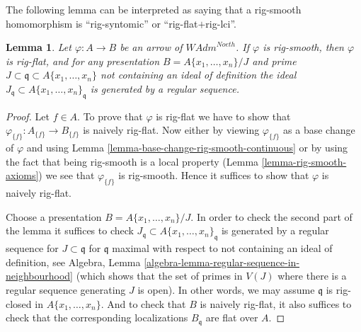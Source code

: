\documentclass{stacks-project}
\theoremstyle{plain}
\newtheorem{lemma}[subsection]{Lemma}
\theoremstyle{definition}
\theoremstyle{remark}
\numberwithin{equation}{subsection}
\begin{document}
\noindent
The following lemma can be interpreted as saying that a rig-smooth
homomorphism is ``rig-syntomic'' or ``rig-flat$+$rig-lci''.

\begin{lemma}
\label{lemma-rig-smooth-rig-flat}
Let $\varphi : A \to B$ be an arrow of $\textit{WAdm}^{Noeth}$.
If $\varphi$ is rig-smooth, then $\varphi$ is rig-flat, and
for any presentation $B = A\{x_1, \ldots, x_n\}/J$
and prime $J \subset \mathfrak q \subset A\{x_1, \ldots, x_n\}$
not containing an ideal of definition the ideal
$J_\mathfrak q \subset A\{x_1, \ldots, x_n\}_\mathfrak q$
is generated by a regular sequence.
\end{lemma}

\begin{proof}
Let $f \in A$. To prove that $\varphi$ is rig-flat we have to show
that $\varphi_{\{f\}} : A_{\{f\}} \to B_{\{f\}}$ is naively rig-flat.
Now either by viewing $\varphi_{\{f\}}$ as a base change of $\varphi$
and using Lemma \ref{lemma-base-change-rig-smooth-continuous}
or by using the fact that being rig-smooth
is a local property (Lemma \ref{lemma-rig-smooth-axioms}) we see that
$\varphi_{\{f\}}$ is rig-smooth. Hence it suffices to show
that $\varphi$ is naively rig-flat.

\medskip\noindent
Choose a presentation $B = A\{x_1, \ldots, x_n\}/J$.
In order to check the second part of the lemma it suffices
to check $J_\mathfrak q \subset A\{x_1, \ldots, x_n\}_\mathfrak q$
is generated by a regular sequence for $J \subset \mathfrak q$
for $\mathfrak q$ maximal with respect to not containing
an ideal of definition, see
Algebra, Lemma \ref{algebra-lemma-regular-sequence-in-neighbourhood}
(which shows that the set of primes in $V(J)$ where there is
a regular sequence generating $J$ is open).
In other words, we may assume $\mathfrak q$ is rig-closed
in $A\{x_1, \ldots, x_n\}$. And to check that
$B$ is naively rig-flat, it also suffices to
check that the corresponding localizations $B_\mathfrak q$
are flat over $A$.


\end{proof}
\end{document}

